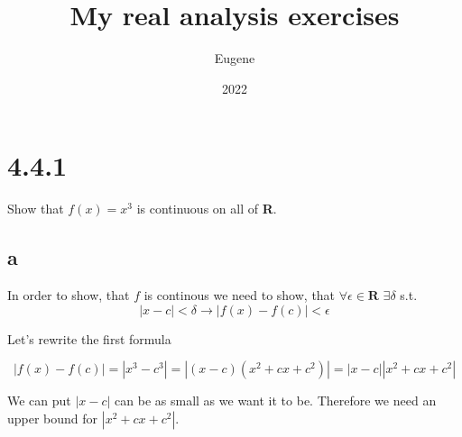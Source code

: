 \documentclass[11pt,oneside,titlepage]{article}   	%
\title{My real analysis exercises}
\author{Eugene}
\date{2022}							%
\begin{document}
\maketitle

\section*{4.4.1}
Show that $f(x) = x^{3}$ is continuous on all of \textbf{R}.

\subsection*{{a}}
In order to show, that $f$ is continous we need to show, that $\forall \epsilon \in \textbf{R}$ $\exists \delta$ s.t.
$$|x - c| < \delta \to |f(x) - f(c)| < \epsilon$$

Let's rewrite the first formula

$$ |f(x) - f(c)| = |x^{3} - c^{3}| = |(x - c)(x^{2} + cx + c^{2})| = |x - c||x^{2} + cx + c^{2}|$$

We can put $|x - c|$ can be as small as we want it to be. Therefore we need an upper bound for $|x^{2} + cx + c^{2}|$.
\end{document}
